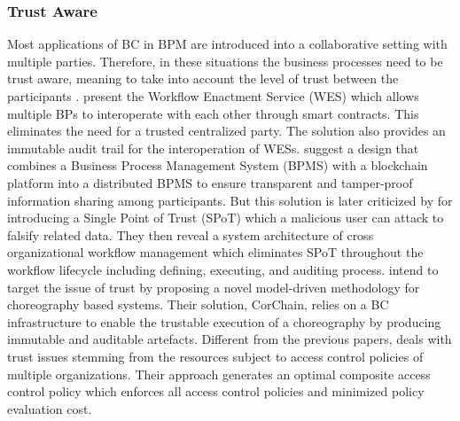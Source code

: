 \subsubsection{Trust Aware}\label{sssec:trust}
Most applications of BC in BPM are introduced into a collaborative setting with multiple parties. Therefore, in these situations the business processes need to be trust aware, meaning to take into account the level of trust between the participants \cite{rosemann2019trust}. \citeauthor{fang_workflow_2020} \cite{fang_workflow_2020} present the Workflow Enactment Service (WES) which allows multiple BPs to interoperate with each other through smart contracts. This eliminates the need for a trusted centralized party. The solution also provides an immutable audit trail for the interoperation of WESs. \citeauthor{alves_exploring_2022} \cite{alves_exploring_2022} suggest a design that combines a Business Process Management System (BPMS) with a blockchain platform into a distributed BPMS to ensure transparent and tamper-proof information sharing among participants. But this solution is later criticized by \citeauthor{nagano_blockchain_2020} \cite{nagano_blockchain_2020} for introducing a Single Point of Trust (SPoT) which a malicious user can attack to falsify related data. They then reveal a system architecture of cross organizational workflow management which eliminates SPoT throughout the workflow lifecycle including defining, executing, and auditing process. \citeauthor{corradini_engineering_2022} \cite{corradini_engineering_2022} intend to target the issue of trust by proposing a novel model-driven methodology for choreography based systems. Their solution, CorChain, relies on a BC infrastructure to enable the trustable execution of a choreography by producing immutable and auditable artefacts. Different from the previous papers, \citeauthor{akhtar_blockchain_2020} \cite{akhtar_blockchain_2020} deals with trust issues stemming from the resources subject to access control policies of multiple organizations. Their approach generates an optimal composite access control policy which enforces all access control policies and minimized policy evaluation cost.

